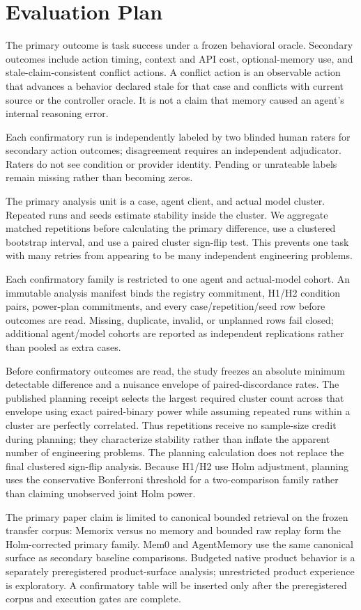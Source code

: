\section{Evaluation Plan}

The primary outcome is task success under a frozen behavioral oracle. Secondary
outcomes include action timing, context and API cost, optional-memory use, and
stale-claim-consistent conflict actions. A conflict action is an observable
action that advances a behavior declared stale for that case and conflicts with
current source or the controller oracle. It is not a claim that memory caused an
agent's internal reasoning error.

Each confirmatory run is independently labeled by two blinded human raters for
secondary action outcomes; disagreement requires an independent adjudicator.
Raters do not see condition or provider identity. Pending or unrateable labels
remain missing rather than becoming zeros.

The primary analysis unit is a case, agent client, and actual model cluster.
Repeated runs and seeds estimate stability inside the cluster. We aggregate
matched repetitions before calculating the primary difference, use a clustered
bootstrap interval, and use a paired cluster sign-flip test. This prevents one
task with many retries from appearing to be many independent engineering
problems.

Each confirmatory family is restricted to one agent and actual-model cohort.
An immutable analysis manifest binds the registry commitment, H1/H2 condition
pairs, power-plan commitments, and every case/repetition/seed row before
outcomes are read. Missing, duplicate, invalid, or unplanned rows fail closed;
additional agent/model cohorts are reported as independent replications rather
than pooled as extra cases.

Before confirmatory outcomes are read, the study freezes an absolute minimum
detectable difference and a nuisance envelope of paired-discordance rates. The
published planning receipt selects the largest required cluster count across
that envelope using exact paired-binary power while assuming repeated runs
within a cluster are perfectly correlated. Thus repetitions receive no
sample-size credit during planning; they characterize stability rather than
inflate the apparent number of engineering problems. The planning calculation
does not replace the final clustered sign-flip analysis. Because H1/H2 use Holm
adjustment, planning uses the conservative Bonferroni threshold for a
two-comparison family rather than claiming unobserved joint Holm power.

The primary paper claim is limited to canonical bounded retrieval on the frozen
transfer corpus: Memorix versus no memory and bounded raw replay form the
Holm-corrected primary family. Mem0 and AgentMemory use the same canonical
surface as secondary baseline comparisons. Budgeted native product behavior is
a separately preregistered product-surface analysis; unrestricted product
experience is exploratory. A confirmatory table will be inserted only after the
preregistered corpus and execution gates are complete.
